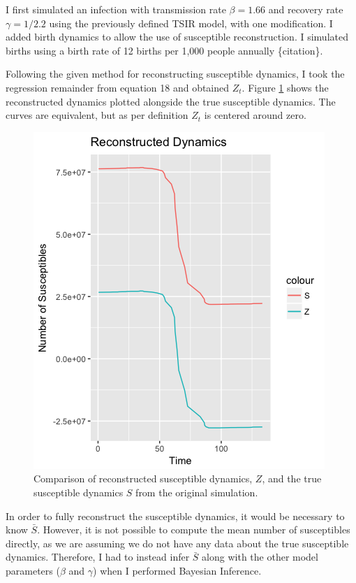 \documentclass{article}
\begin{document}
I first simulated an infection with transmission rate $\beta = 1.66$ and recovery rate $\gamma = 1/2.2$ using the previously defined TSIR model, with one modification. I added birth dynamics to allow the use of susceptible reconstruction. I simulated births using a birth rate of 12 births per 1,000 people annually \{citation\}. 

Following the given method for reconstructing susceptible dynamics, I took the regression remainder from equation 18 and obtained $Z_{t}$. Figure \ref{fig:ZvsS} shows the reconstructed dynamics plotted alongside the true susceptible dynamics. The curves are equivalent, but as per definition $Z_{t}$ is centered around zero. 

\begin{figure}[htbp]
\includegraphics[scale=.5, center]{ZvsSplot.png}
\caption{Comparison of reconstructed susceptible dynamics, $Z$, and the true susceptible dynamics $S$ from the original simulation.}
\label{fig:ZvsS}
\end{figure}

In order to fully reconstruct the susceptible dynamics, it would be necessary to know $\bar{S}$. However, it is not possible to compute the mean number of susceptibles directly, as we are assuming we do not have any data about the true susceptible dynamics. Therefore, I had to instead infer $\bar{S}$ along with the other model parameters ($\beta$ and $\gamma$) when I performed Bayesian Inference. 
\end{document}
